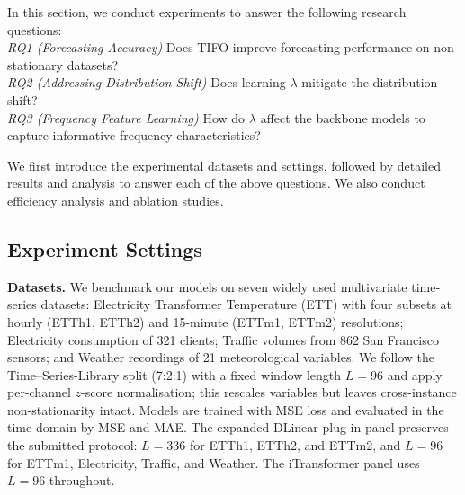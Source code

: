 \documentclass[sigconf,anonymous,review]{acmart}
\newcommand{\resubmitchange}[1]{#1}
\newcommand{\methodn}{\textsc{TIFO}}
\newcommand{\method}{\textsc{\methodn}\xspace}
\begin{document}
In this section, we conduct experiments to answer the following research questions: \\ 
 \textit{RQ1 (Forecasting Accuracy)}
Does \method improve forecasting performance on non-stationary datasets? \\
 \textit{RQ2 (Addressing Distribution Shift)} 
Does learning $\lambda$ mitigate the distribution shift?\\
 \textit{RQ3 (Frequency Feature Learning)} 
How do $\lambda$ affect the backbone models to capture informative frequency characteristics?

We first introduce the experimental datasets and settings, followed by detailed results and analysis to answer each of the above questions.
We also conduct efficiency analysis and ablation studies.


%

\subsection{Experiment Settings}

\noindent\textbf{Datasets.} 
We benchmark our models on seven widely used multivariate time‐series datasets:
Electricity Transformer Temperature (ETT) with four subsets at hourly (ETTh1, ETTh2) and 15-minute (ETTm1, ETTm2) resolutions; 
Electricity consumption of 321 clients; 
Traffic volumes from 862 San Francisco sensors; 
and Weather recordings of 21 meteorological variables.  
We follow the Time–Series-Library split (7:2:1) with a fixed window length $L=96$ and apply per-channel $z$-score normalisation; 
this rescales variables but leaves cross-instance non-stationarity intact.
Models are trained with MSE loss and evaluated in the time domain by MSE and MAE.
\resubmitchange{The expanded DLinear plug-in panel preserves the submitted
protocol: $L=336$ for ETTh1, ETTh2, and ETTm2, and $L=96$ for ETTm1,
Electricity, Traffic, and Weather. The iTransformer panel uses $L=96$
throughout.}
\end{document}
